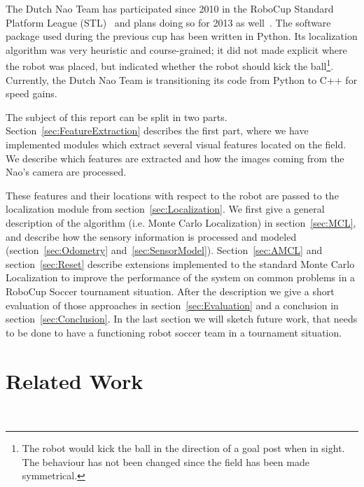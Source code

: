 \documentclass[	DIV=calc,%
							paper=a4,%
							fontsize=9pt,%
							twocolumn]{scrartcl}	 					%
\begin{document}
The Dutch Nao Team has participated since 2010 in the RoboCup Standard Platform League (STL)~\cite{DNT-TD10, DNT-TD11, DNT-TD12} and plans doing so for 2013 as well~\cite{DNT-TD13}.  The software package used during the previous cup has been written in Python.  Its localization algorithm was very heuristic and course-grained; it did not made explicit where the robot was placed, but indicated whether the robot should kick the ball\footnote{The robot would kick the ball in the direction of a goal post when in sight. The behaviour has not been changed since the field has been made symmetrical.}.  Currently, the Dutch Nao Team is transitioning its code from Python to C++ for speed gains. 

The subject of this report can be split in two parts. Section~\ref{sec:FeatureExtraction} describes the first part, where we have implemented modules which extract several visual features located on the field.  We describe which features are extracted and how the images coming from the Nao's camera are processed. 

These features and their locations with respect to the robot are passed to the localization module from section~\ref{sec:Localization}.  We first give a general description of the algorithm (i.e. Monte Carlo Localization) in section~\ref{sec:MCL}, and describe how the sensory information is processed and modeled (section~\ref{sec:Odometry} and~\ref{sec:SensorModel}). Section~\ref{sec:AMCL} and section~\ref{sec:Reset} describe extensions implemented to the standard Monte Carlo Localization to improve the performance of the system on common problems in a RoboCup Soccer tournament situation. 
After the description we give a short evaluation of those approaches in section~\ref{sec:Evaluation} and a conclusion in section~\ref{sec:Conclusion}. In the last section we will sketch future work, that needs to be done to have a functioning robot soccer team in a tournament situation.

\section{Related Work}
~\cite{canas2009visual}
~\cite{ashar2010robocup}
~\cite{canas2010recognition}
~\cite{schulz2012utilizing}
~\cite{deng2011natural}
\end{document}
